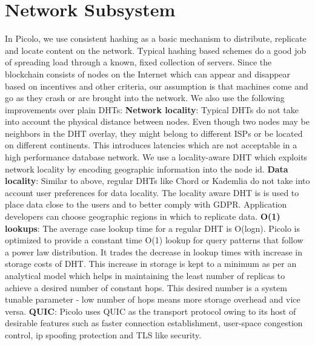 \documentclass[preprint,12pt]{elsarticle}
\begin{document}
\section{Network Subsystem} 
In Picolo, we use consistent hashing as a basic mechanism to distribute, replicate and locate content on the network.
Typical hashing based schemes do a good job of spreading load through a known, fixed collection of servers. Since the
blockchain consists of nodes on the Internet which can appear and disappear based on incentives and other criteria, our
assumption is that machines come and go as they crash or are brought into the network. We also use the following improvements over plain DHTs:
\newline
\newline
\textbf{Network locality}: Typical DHTs do not take into account the physical distance between nodes. Even though two nodes may be neighbors in the DHT overlay, they might belong to different ISPs or be located on different continents. This introduces latencies which are not acceptable in a high performance database network. We use a locality-aware DHT which exploits network locality by encoding geographic information into the node id.
\newline
\newline
\textbf{Data locality}: Similar to above, regular DHTs like Chord or Kademlia do not take into account user preferences for data locality. The locality aware DHT is is used to place data close to the users and to better comply with GDPR. Application developers can choose  geographic regions in which to replicate data.
\newline
\newline
\textbf{O(1) lookups}: The average case lookup time for a regular DHT is O(logn). Picolo is optimized to provide a constant time O(1) lookup for query patterns that follow a power law distribution. It trades the decrease in lookup times with increase in storage costs of DHT. This increase in storage is kept to a minimum as per an analytical model which helps in maintaining the least number of replicas to achieve a desired number of constant hops. This desired number is a system tunable parameter - low number of hops means more storage overhead and vice versa.
\newline
\newline
\textbf{QUIC}: Picolo uses QUIC as the transport protocol owing to its host of desirable features such as faster connection establishment, user-space congestion control, ip spoofing protection and TLS like security.
\end{document}
